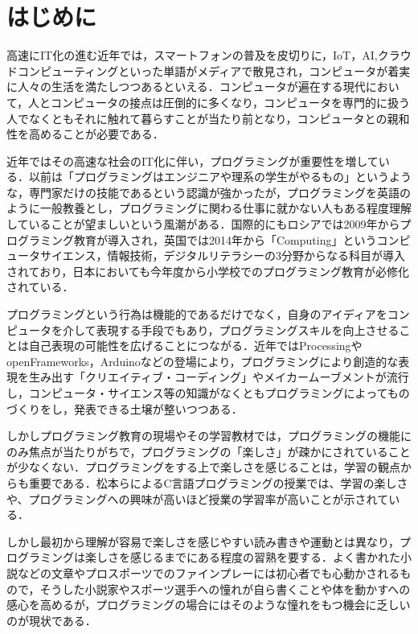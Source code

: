 \section{はじめに}

高速にIT化の進む近年では，スマートフォンの普及を皮切りに，IoT，AI,クラウドコンピューティングといった単語がメディアで散見され，コンピュータが着実に人々の生活を満たしつつあるといえる．コンピュータが遍在する現代において，人とコンピュータの接点は圧倒的に多くなり，コンピュータを専門的に扱う人でなくともそれに触れて暮らすことが当たり前となり，コンピュータとの親和性を高めることが必要である．

近年ではその高速な社会のIT化に伴い，プログラミングが重要性を増している．以前は「プログラミングはエンジニアや理系の学生がやるもの」というような，専門家だけの技能であるという認識が強かったが，プログラミングを英語のように一般教養とし，プログラミングに関わる仕事に就かない人もある程度理解していることが望ましいという風潮がある．国際的にもロシアでは2009年からプログラミング教育が導入され，英国では2014年から「Computing」というコンピュータサイエンス，情報技術，デジタルリテラシーの3分野からなる科目が導入されており\cite{survey}，日本においても今年度から小学校でのプログラミング教育が必修化されている\cite{guide}．


プログラミングという行為は機能的であるだけでなく，自身のアイディアをコンピュータを介して表現する手段でもあり，プログラミングスキルを向上させることは自己表現の可能性を広げることにつながる．近年ではProcessingやopenFrameworks，Arduinoなどの登場により，プログラミングにより創造的な表現を生み出す「クリエイティブ・コーディング」やメイカームーブメントが流行し，コンピュータ・サイエンス等の知識がなくともプログラミングによってものづくりをし，発表できる土壌が整いつつある．

しかしプログラミング教育の現場やその学習教材では，プログラミングの機能にのみ焦点が当たりがちで，プログラミングの「楽しさ」が疎かにされていることが少なくない．プログラミングをする上で楽しさを感じることは，学習の観点からも重要である．松本らによるC言語プログラミングの授業では、学習の楽しさや、プログラミングへの興味が高いほど授業の学習率が高いことが示されている\cite{matsumoto}．

しかし最初から理解が容易で楽しさを感じやすい読み書きや運動とは異なり，プログラミングは楽しさを感じるまでにある程度の習熟を要する．よく書かれた小説などの文章やプロスポーツでのファインプレーには初心者でも心動かされるもので，そうした小説家やスポーツ選手への憧れが自ら書くことや体を動かすへの感心を高めるが，プログラミングの場合にはそのような憧れをもつ機会に乏しいのが現状である．

